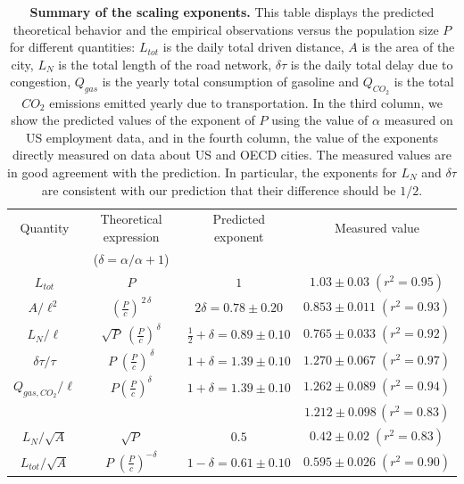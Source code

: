 \begin{table}[!h]
\begin{tabular}{|c|c|c|c|}
\hline
Quantity & Theoretical expression & Predicted exponent & Measured value\\
  $\;\;$  & ($\delta=\alpha/\alpha+1$) & & \\ \hline
$L_{tot}$ & $P$ & $1$ & $1.03 \pm 0.03\;(r^2=0.95)$\\ 
$A / \ell^2$ & $\left( \frac{P}{c} \right)^{\,2\,\delta}$ & $2 \delta = 0.78 \pm 0.20$ & $0.853 \pm 0.011\; (r^2=0.93)$\\
$L_N / \ell$ & $\sqrt{P}\; \left(\frac{P}{c}\right)^{\,\delta}$ & $\frac{1}{2} + \delta = 0.89 \pm 0.10 $ & $0.765 \pm 0.033\; (r^2=0.92)$\\
$\delta \tau / \tau$ & $P\; \left( \frac{P}{c} \right)^{\, \delta}$ & $1 +
\delta = 1.39 \pm 0.10$ & $1.270 \pm 0.067\; (r^2=0.97)$\\
$Q_{gas,CO_2}/\ell$  & $P\left( \frac{P}{c}\right)^{\delta}$ & $1+\delta=1.39 \pm 0.10$ & $1.262 \pm 0.089\; (r^2=0.94)$\\
& & & $1.212 \pm 0.098\, (r^2=0.83)$\\
\hline \hline
$L_N / \sqrt{A}$ & $\sqrt{P}$ & $0.5$ & $0.42 \pm 0.02\;(r^2=0.83)$\\
$L_{tot} / \sqrt{A}$ &  $P\;
\left(\frac{P}{c}\right)^{-\delta}$ & $1 - \delta = 0.61 \pm 0.10$ & $0.595 \pm 0.026\; (r^2=0.90)$\\
\hline
\end{tabular}
\caption{{\bf Summary of the scaling exponents.} This table displays the predicted theoretical behavior and
  the empirical observations versus the population size $P$ for
  different quantities: $L_{tot}$ is the daily total driven distance,
  $A$ is the area of the city, $L_{N}$ is the total length of the road
  network, $\delta\tau$ is the daily total delay due to congestion,
  $Q_{gas}$ is the yearly total consumption of gasoline and $Q_{CO_2}$
  is the total $CO_2$ emissions emitted yearly due to
  transportation. In the third column, we show the predicted values of
  the exponent of $P$ using the value of $\alpha$ measured on US
  employment data, and in the fourth column, the value of the
  exponents directly measured on data about US and OECD cities. The
  measured values are in good agreement with the prediction. In
  particular, the exponents for $L_N$ and $\delta \tau$ are consistent
  with our prediction that their difference should be $1/2$.}
\label{table:results}
\end{table}



